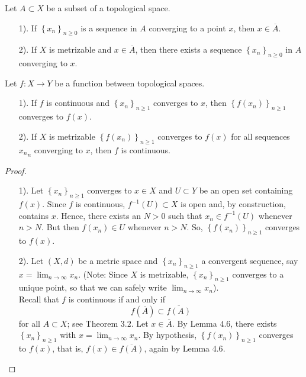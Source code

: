 \begin{customlemma}{4.6}
Let $A \subset X$ be a subset of a topological space.
\begin{enumerate}
    \item[1).] If $\left\{x_n\right\}_{n \geqslant 0}$ is a sequence in $A$ converging to a point $x$, then $x \in \overline{A}$.
    \item[2).] If $X$ is metrizable and $x \in \overline{A}$, then there exists a sequence $\left\{x_n\right\}_{n \geqslant 0}$ in $A$ converging to $x$.
\end{enumerate}
\end{customlemma}

\begin{customthm}{4.7}
Let $f: X \longrightarrow Y$ be a function between topological spaces.
\begin{enumerate}
    \item[1).] If $f$ is continuous and $\left\{x_n\right\}_{n \geqslant 1}$ converges to $x$, then $\left\{f(x_n)\right\}_{n \geqslant 1}$ converges to $f(x)$.
    \item[2).] If $X$ is metrizable $\left\{f(x_n)\right\}_{n \geqslant 1}$ converges to $f(x)$ for all sequences ${x_n}_n$ converging to $x$, then $f$ is continuous.
\end{enumerate}
\end{customthm}

\newpage

\begin{proof}
\begin{enumerate}
    \item[1).] Let $\left\{x_n\right\}_{n \geqslant 1}$ converges to $x \in X$ and $U \subset Y$ be an open set containing $f(x)$. Since $f$ is continuous, $f^{-1}(U) \subset X$ is open and, by construction, contains $x$. Hence, there exists an $N>0$ such that $x_n \in f^{-1} (U)$ whenever $n >N$. But then $f(x_n) \in U$ whenever $n>N$. So, $\left\{f(x_n)\right\}_{n \geqslant 1}$ converges to $f(x)$.
    \item[2).] Let $(X, d)$ be a metric space and $\left\{x_n\right\}_{n \geqslant 1}$ a convergent sequence, say $x = \displaystyle\lim_{n \to \infty} x_n$. (Note: Since $X$ is metrizable, $\left\{x_n\right\}_{n \geqslant 1}$ converges to a unique point, so that we can safely write $\displaystyle\lim_{n \to \infty} x_n$).\\
    Recall that $f$ is continuous if and only if 
    $$f\left(\overline{A}\right) \subset \overline{f(A)}$$
    for all $A\subset X$; see Theorem $3.2$. Let $x\in \overline{A}$. By Lemma $4.6$, there exists $\left\{x_n\right\}_{n \geqslant 1}$ with $x = \displaystyle\lim_{n \to \infty} x_n$. By hypothesis, $\left\{f(x_n)\right\}_{n \geqslant 1}$ converges to $f(x)$, that is, $f(x) \in \overline{f(A)}$, again by Lemma $4.6$.
\end{enumerate}
\end{proof}

